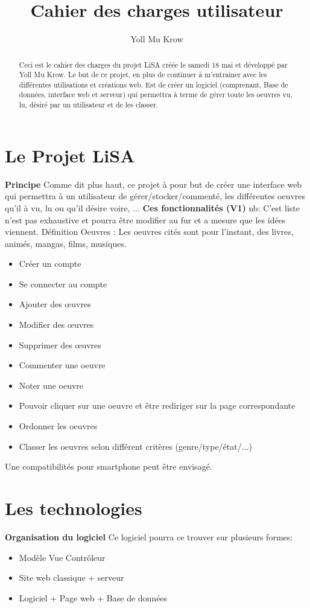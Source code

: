 \documentclass[12pt]{report}
\begin{document}
\title{Cahier des charges utilisateur}
\author{Yoll Mu Krow}

\maketitle

\begin{abstract}
	Ceci est le cahier des charges du projet LiSA créée le samedi 18 mai et développé par Yoll Mu Krow.
	Le but de ce projet, en plus de continuer à m'entrainer avec les différentes utilisations et créations web. Est de créer un logiciel (comprenant, Base de données, interface web et serveur) qui permettra à terme de gérer toute les oeuvres vu, lu, désiré par un utilisateur et de les classer.
\end{abstract}
\newpage
\tableofcontents
\newpage

\section{Le Projet LiSA}
\textbf{Principe}
Comme dit plus haut, ce projet à pour but de créer une interface web qui permettra à un utilisateur de gérer/stocker/commenté, les différentes oeuvres qu'il à vu, lu ou qu'il désire voire, ...
\textbf{Ces fonctionnalités (V1)}
nb: C'est liste n'est pas exhaustive et pourra être modifier au fur et a mesure que les idées viennent.
Définition Oeuvres : Les oeuvres cités sont pour l'instant, des livres, animés, mangas, films, musiques.

\begin{itemize}
	\item Créer un compte
	\item Se connecter au compte
	\item Ajouter des œuvres 
	\item Modifier des œuvres
	\item Supprimer des œuvres
	\item Commenter une oeuvre
	\item Noter une oeuvre
	\item Pouvoir cliquer sur une oeuvre et être rediriger sur la page correspondante
	\item Ordonner les oeuvres
	\item Classer les oeuvres selon différent critères (genre/type/état/...)
\end{itemize}
Une compatibilités pour smartphone peut être envisagé.

\section{Les technologies}
\textbf{Organisation du logiciel}
Ce logiciel pourra ce trouver sur plusieurs formes:
\begin{itemize}
	\item Modèle Vue Contrôleur 
	\item Site web classique + serveur
	\item Logiciel + Page web + Base de données
\end{itemize}
\end{document}
